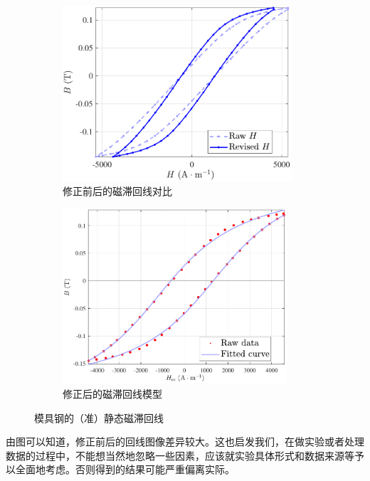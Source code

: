 \documentclass[UTF8]{article}
\theoremstyle{MyLineTheoremStyle} %
\theoremstyle{MyBlockTheoremStyle} %
\theoremstyle{MySubsubsectionStyle} %
\begin{document}
\begin{figure}[H]\centering
\begin{subfigure}[b]{0.5\columnwidth}\centering
    \includegraphics[height=185pt]{assets/2.2/2024-10-29_01-43-42.pdf}
    \caption{修正前后的磁滞回线对比}
\end{subfigure}\hfill
\begin{subfigure}[b]{0.5\columnwidth}\centering
    \includegraphics[height=185pt]{assets/2.2/2024-10-29_01-43-46.pdf}
    \caption{修正后的磁滞回线模型}
\end{subfigure}
\caption{模具钢的（准）静态磁滞回线}
\end{figure}

由图可以知道，修正前后的回线图像差异较大。这也启发我们，在做实验或者处理数据的过程中，不能想当然地忽略一些因素，应该就实验具体形式和数据来源等予以全面地考虑。否则得到的结果可能严重偏离实际。
\end{document}
